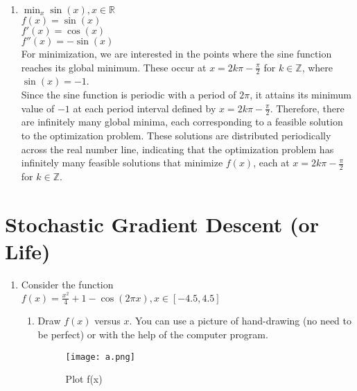 \documentclass{assignment}
\newcommand{\R}{\mathbb{R}}
\begin{document}
\begin{problem}
\begin{enumerate}
\begin{enumerate}
    

\item $\min_x \sin(x), x \in \R$\\

    $f(x) = \sin(x)$\\
    $f'(x) = \cos(x)$\\
    $f''(x) = -\sin(x)$\\

    For minimization, we are interested in the points where the sine function reaches its global minimum. These occur at $x = 2k\pi - \frac{\pi}{2}$ for $k \in \mathbb{Z}$, where $\sin(x) = -1$.\\
    
    Since the sine function is periodic with a period of $2\pi$, it attains its minimum value of $-1$ at each period interval defined by $x = 2k\pi - \frac{\pi}{2}$. Therefore, there are infinitely many global minima, each corresponding to a feasible solution to the optimization problem. These solutions are distributed periodically across the real number line, indicating that the optimization problem has infinitely many feasible solutions that minimize $f(x)$, each at $x = 2k\pi - \frac{\pi}{2}$ for $k \in \mathbb{Z}$.
\end{enumerate}
\end{enumerate}

\section{Stochastic Gradient Descent (or Life)}

\begin{enumerate}
    \item Consider the function\\
    
    $f(x) = \frac{x^2}{4} + 1 -\cos(2\pi x), x\in [-4.5, 4.5]$

    \begin{enumerate}
        \item Draw $f(x)$ versus $x$. You can use a picture of hand-drawing (no need to be perfect) or with the help of the computer program.\\

            \begin{figure}[H]
               \centering
                \texttt{[image: a.png]}
                \caption{Plot f(x)}
                \label{fig:enter-label}
            \end{figure}
            

\end{enumerate}
\end{enumerate}
\end{problem}
\end{document}
